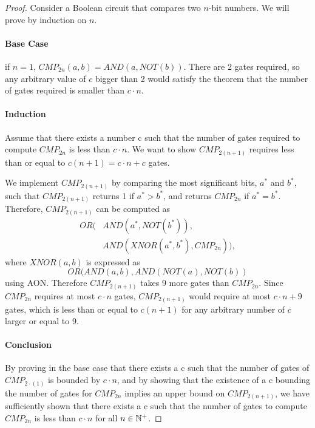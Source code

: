 \documentclass[11pt]{article}
\begin{document}
\begin{proof} Consider a Boolean circuit that compares two $n$-bit numbers. We will prove by induction on $n$.

\paragraph{Base Case} if $n=1$, $CMP_{2n} (a,b) = AND(a, NOT(b))$. There are 2 gates required, so any arbitrary value of $c$ bigger than 2 would satisfy the theorem that the number of gates required is smaller than $c \cdot n$.

\paragraph{Induction} Assume that there exists a number c such that the number of gates required to compute $CMP_{2n}$ is less than $c \cdot n$. We want to show $CMP_{2(n+1)}$ requires less than or equal to $c(n+1) = c \cdot n + c$ gates.

We implement $CMP_{2(n+1)}$ by comparing the most significant bits, $a^{*}$ and $b^{*}$, such that $CMP_{2(n+1)}$ returns 1 if $a^{*} > b^{*}$, and returns $CMP_{2n}$ if $a^{*} = b^{*}$. Therefore, $CMP_{2(n+1)}$ can be computed as
\begin{align*}
    OR(&AND(a^*, NOT(b^*)), \\
    &AND(XNOR(a^*, b^*), CMP_{2n})),
\end{align*}
where $XNOR(a, b)$ is expressed as
\begin{equation*}
    OR(AND(a, b), AND(NOT(a), NOT(b))
\end{equation*}
using AON. Therefore $CMP_{2(n+1)}$ takes 9 more gates than $CMP_{2n}$. Since $CMP_{2n}$ requires at most $c \cdot n$ gates, $CMP_{2(n+1)}$ would require at most $c \cdot n + 9$ gates, which is less than or equal to $c (n + 1)$ for any arbitrary number of $c$ larger or equal to 9.

\paragraph{Conclusion} By proving in the base case that there exists a c such that the number of gates of $CMP_{2 \cdot (1)}$ is bounded by $c \cdot n$, and by showing that the existence of a c bounding the number of gates for $CMP_{2n}$ implies an upper bound on $CMP_{2(n+1)}$, we have sufficiently shown that there exists a c such that the number of gates to compute $CMP_{2n}$ is less than $c \cdot n$ for all $n \in \mathbb{N}^+$.

\end{proof}
 
\end{document}
